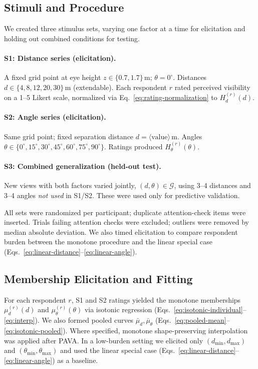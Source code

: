 \documentclass[final,3p,times,review]{elsarticle}
\begin{document}
\subsection{Stimuli and Procedure}
We created three stimulus sets, varying one factor at a time for elicitation and holding out combined conditions for testing.

\paragraph{S1: Distance series (elicitation).}
A fixed grid point at eye height $z\in\{0.7,1.7\}$\,m; $\theta=0^\circ$. Distances $d\in\{4,8,12,20,30\}$\,m (extendable). Each respondent $r$ rated perceived visibility on a 1--5 Likert scale, normalized via Eq.~\eqref{eq:rating-normalization} to $H^{(r)}_d(d)$.

\paragraph{S2: Angle series (elicitation).}
Same grid point; fixed separation distance $d=\langle \text{value} \rangle$\,m. Angles $\theta\in\{0^\circ,15^\circ,30^\circ,45^\circ,60^\circ,75^\circ,90^\circ\}$. Ratings produced $H^{(r)}_\theta(\theta)$.

\paragraph{S3: Combined generalization (held-out test).}
New views with both factors varied jointly, $(d,\theta)\in\mathcal{G}$, using 3--4 distances and 3--4 angles \emph{not used} in S1/S2. These were used only for predictive validation.

All sets were randomized per participant; duplicate attention-check items were inserted. Trials failing attention checks were excluded; outliers were removed by median absolute deviation. We also timed elicitation to compare respondent burden between the monotone procedure and the linear special case (Eqs.~\eqref{eq:linear-distance}--\eqref{eq:linear-angle}).

\subsection{Membership Elicitation and Fitting}
For each respondent $r$, S1 and S2 ratings yielded the monotone memberships $\mu^{(r)}_d(d)$ and $\mu^{(r)}_\theta(\theta)$ via isotonic regression (Eqs.~\eqref{eq:isotonic-individual}--\eqref{eq:interp}). We also formed pooled curves $\bar{\mu}_d,\bar{\mu}_\theta$ (Eqs.~\eqref{eq:pooled-mean}--\eqref{eq:isotonic-pooled}). Where specified, monotone shape-preserving interpolation was applied after PAVA. In a low-burden setting we elicited only $(d_{\min},d_{\max})$ and $(\theta_{\min},\theta_{\max})$ and used the linear special case (Eqs.~\eqref{eq:linear-distance}--\eqref{eq:linear-angle}) as a baseline.
\end{document}
